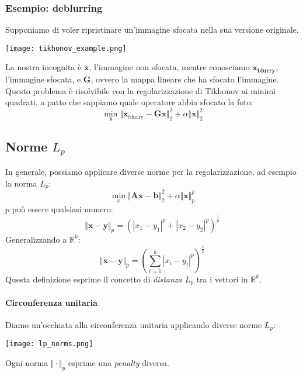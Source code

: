 \documentclass{article}
\begin{document}
            \subsubsection{Esempio: deblurring}
                Supponiamo di voler ripristinare un'immagine sfocata nella sua versione originale.
                \begin{center}\texttt{[image: tikhonov\_example.png]}\end{center}
                La nostra 
                incognita è $\mathbf{x}$, l'immagine non sfocata, mentre conosciamo $\mathbf{x_{\text{blurry}}}$, l'immagine sfocata, e $\mathbf{G}$, ovvero 
                la mappa lineare che ha sfocato l'immagine. Questo problema è risolvibile con la regolarizzazione di Tikhonov ai minimi quadrati, a patto che 
                sappiamo quale operatore abbia sfocato la foto:
                \[\min_\mathbf{x} \Vert \mathbf{x}_{\text{blurry}} - \mathbf{Gx} \Vert_2^2 + \alpha \Vert \mathbf{x} \Vert_2^2 \]
        \subsection{Norme $L_p$}
            In generale, possiamo applicare diverse norme per la regolarizzazione, ad esempio la norma $L_p$:
            \[ \min_x \Vert \mathbf{Ax} - \mathbf{b} \Vert_2^2 + \alpha \Vert \mathbf{x} \Vert_p^p \]
            $p$ può essere qualsiasi numero:
            \[\Vert \mathbf{x} - \mathbf{y} \Vert_p = (|x_1 - y_1|^p + |x_2 - y_2|^p)^\frac{1}{p}\]
            Generalizzando a $\mathbb{R}^k$:
            \[\Vert \mathbf{x} - \mathbf{y} \Vert_p = (\sum_{i=1}^k |x_i - y_i|^p)^\frac{1}{p}\]
            Questa definizione esprime il concetto di \emph{distanza $L_p$} tra i vettori in $\mathbb{R}^k$.

            \newpage 

            \paragraph{Circonferenza unitaria}
                Diamo un'occhiata alla circonferenza unitaria applicando diverse norme $L_p$:
                \begin{center}\texttt{[image: lp\_norms.png]}\end{center}
                Ogni norma $\Vert \cdot \Vert_p$ esprime una \emph{penalty} diversa.
        
\end{document}
